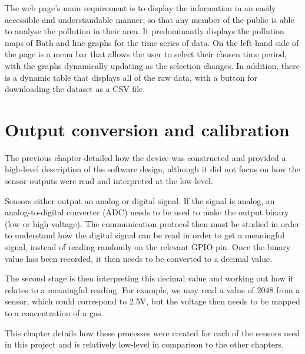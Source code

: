 \documentclass[11pt,twosided,a4paper]{report}
\begin{document}
The web page's main requirement is to display the information in an easily accessible and understandable manner, so that any member of the public is able to analyse the pollution in their area. It predominantly displays the pollution maps of Bath and line graphs for the time series of data. On the left-hand side of the page is a menu bar that allows the user to select their chosen time period, with the graphs dynamically updating as the selection changes. In addition, there is a dynamic table that displays all of the raw data, with a button for downloading the dataset as a CSV file.



\chapter{Output conversion and calibration} \label{chap: calibration}

The previous chapter detailed how the device was constructed and provided a high-level description of the software design, although it did not focus on how the sensor outputs were read and interpreted at the low-level.

Sensors either output an analog or digital signal. If the signal is analog, an analog-to-digital converter (ADC) needs to be used to make the output binary (low or high voltage). The communication protocol then must be studied in order to understand how the digital signal can be read in order to get a meaningful signal, instead of reading randomly on the relevant GPIO pin. Once the binary value has been recorded, it then needs to be converted to a decimal value.

The second stage is then interpreting this decimal value and working out how it relates to a meaningful reading. For example, we may read a value of 2048 from a sensor, which could correspond to 2.5V, but the voltage then needs to be mapped to a concentration of a gas.

This chapter details how these processes were created for each of the sensors used in this project and is relatively low-level in comparison to the other chapters.
\end{document}
